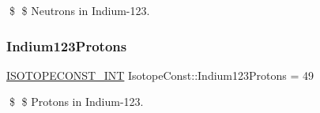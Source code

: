 \$ \$ Neutrons in Indium-\/123. \mbox{\label{group___isotope_const-_indium-_in123_gaa630e73895e055fa4cb983ff9b2c95cb}} 
\subsubsection{\texorpdfstring{Indium123\+Protons}{Indium123Protons}}
{\footnotesize\ttfamily \mbox{\hyperlink{group___isotope_const-_macros_ga5f18360b3e99483a35c32d789e62621c}{I\+S\+O\+T\+O\+P\+E\+C\+O\+N\+S\+T\+\_\+\+I\+NT}} Isotope\+Const\+::\+Indium123\+Protons = 49}

\$ \$ Protons in Indium-\/123. 